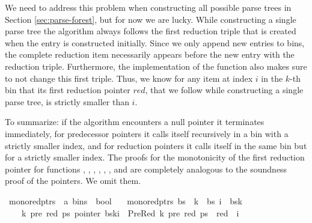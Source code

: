 \begin{isabellebody}
\begin{isamarkuptext}
We need to address this problem when constructing all possible parse trees in Section \ref{sec:parse-forest},
but for now we are lucky. While constructing a single parse tree the algorithm always follows the
first reduction triple that is created when the entry is constructed initially. Since we only
append new entries to bins, the complete reduction item necessarily appears before the new entry with
the reduction triple. Furthermore, the implementation of the function  also makes sure to not change this
first triple. Thus, we know for any item at index $i$ in the $k$-th bin that its first reduction pointer $red$,
that we follow while constructing a single parse tree, is strictly smaller than $i$.

To summarize:
if the algorithm encounters a null pointer it terminates immediately, for predecessor pointers it
calls itself recursively in a bin with a strictly smaller index, and for reduction pointers it calls
itself in the same bin but for a strictly smaller index. The proofs for the monotonicity of the first
reduction pointer for functions , , , ,
, , and  are completely analogous to
the soundness proof of the pointers. We omit them.%
\end{isamarkuptext}\isamarkuptrue%
\isamarkupfalse%
\ mono{\isacharunderscore}{\kern0pt}red{\isacharunderscore}{\kern0pt}ptrs\ {\isacharcolon}{\kern0pt}{\isacharcolon}{\kern0pt}\ {\isachardoublequoteopen}{\isacharprime}{\kern0pt}a\ bins\ {\isasymRightarrow}\ bool{\isachardoublequoteclose}\ \isanewline
\ \ {\isachardoublequoteopen}mono{\isacharunderscore}{\kern0pt}red{\isacharunderscore}{\kern0pt}ptrs\ bs\ {\isasymequiv}\ {\isasymforall}k\ {\isacharless}{\kern0pt}\ {\isacharbar}{\kern0pt}bs{\isacharbar}{\kern0pt}{\isachardot}{\kern0pt}\ {\isasymforall}i\ {\isacharless}{\kern0pt}\ {\isacharbar}{\kern0pt}bs{\isacharbang}{\kern0pt}k{\isacharbar}{\kern0pt}{\isachardot}{\kern0pt}\isanewline
\ \ \ \ {\isasymforall}k{\isacharprime}{\kern0pt}\ pre\ red\ ps{\isachardot}{\kern0pt}\ pointer\ {\isacharparenleft}{\kern0pt}bs{\isacharbang}{\kern0pt}k{\isacharbang}{\kern0pt}i{\isacharparenright}{\kern0pt}\ {\isacharequal}{\kern0pt}\ PreRed\ {\isacharparenleft}{\kern0pt}k{\isacharprime}{\kern0pt}{\isacharcomma}{\kern0pt}\ pre{\isacharcomma}{\kern0pt}\ red{\isacharparenright}{\kern0pt}\ ps\ {\isasymlongrightarrow}\ red\ {\isacharless}{\kern0pt}\ i{\isachardoublequoteclose}%

\end{isabellebody}
